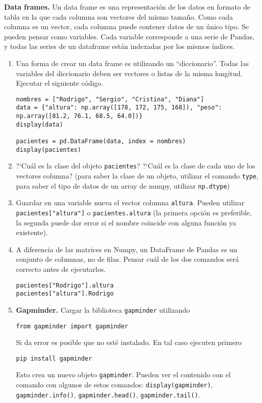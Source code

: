 \documentclass[a4paper,11pt]{article}
\theoremstyle{definition}
\begin{document}
\textbf{Data frames.} Un data frame es una representaci\'on de los datos en formato de tabla en la que cada columna son vectores del mismo tama\~no. Como cada columna es un vector, cada columna puede contener datos de un \'unico tipo. Se pueden pensar como variables. Cada variable corresponde a una serie de Pandas, y todas las series de un dataframe están indexadas por los mismos índices.

\begin{enumerate}[resume]
\item Una forma de crear un data frame es utilizando un ``diccionario''. Todas las variables del diccionario deben ser vectores o listas de la misma longitud. Ejecutar el siguiente c\'odigo.

\begin{lstlisting}
nombres = ["Rodrigo", "Sergio", "Cristina", "Diana"]
data = {"altura": np.array([178, 172, 175, 168]), "peso": np.array([81.2, 76.1, 68.5, 64.0])}
display(data)

pacientes = pd.DataFrame(data, index = nombres)
display(pacientes)
\end{lstlisting}

\item ?`Cuál es la clase del objeto \lstinline{pacientes}? ?`Cuál es la clase de cada uno de los vectores columna? (para saber la clase de un objeto, utilizar el comando \lstinline{type}, para saber el tipo de datos de un array de numpy, utilizar \lstinline{np.dtype})

\item Guardar en una variable nueva el vector columna \lstinline{altura}. Pueden utilizar \lstinline{pacientes["altura"]} o \lstinline{pacientes.altura} (la primera opci\'on es preferible, la segunda puede dar error si el nombre coincide con alguna funci\'on ya existente).

\item A diferencia de las matrices en Numpy, un DataFrame de Pandas es un conjunto de columnas, no de filas. Pensar cu\'al de los dos comandos ser\'a correcto antes de ejecutarlos.
\begin{lstlisting}
pacientes["Rodrigo"].altura
pacientes["altura"].Rodrigo
\end{lstlisting}
    
    
\item \textbf{Gapminder.} Cargar la biblioteca \lstinline{gapminder} utilizando
\begin{lstlisting}
from gapminder import gapminder
\end{lstlisting}
Si da error es posible que no est\'e instalado. En tal caso ejecuten primero
\begin{lstlisting}
pip install gapminder
\end{lstlisting}
Esto crea un nuevo objeto \lstinline{gapminder}. Pueden ver el contenido con el comando con algunos de estos comandos: \lstinline{display(gapminder)}, \lstinline{gapminder.info()}, \lstinline{gapminder.head()}, \lstinline{gapminder.tail()}.


\end{enumerate}
\end{document}
